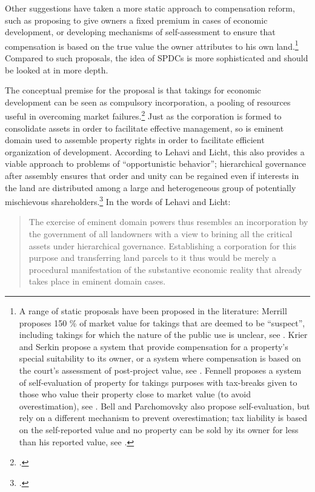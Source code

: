 Other suggestions have taken a more static approach to compensation reform, such as proposing to give owners a fixed premium in cases of economic development, or developing mechanisms of self-assessment to ensure that compensation is based on the true value the owner attributes to his own land.\footnote{A range of static proposals have been proposed in the literature: Merrill proposes 150 \% of market value for takings that are deemed to be ``suspect'', including takings for which the nature of the public use is unclear, see \cite[90-93]{merrill86}. Krier and Serkin propose a system that provide compensation for a property's special suitability to its owner, or a system where compensation is based on the court's assessment of post-project value, see \cite[865-873]{krier04}. Fennell proposes a system of self-evaluation of property for takings purposes with tax-breaks given to those who value their property close to market value (to avoid overestimation), see \cite[995-996]{fennell04}. Bell and Parchomovsky also propose self-evaluation, but rely on a different mechanism to prevent overestimation; tax liability is based on the self-reported value and no property can be sold by its owner for less than his reported value, see \cite[890-900]{bell07}.} Compared to such proposals, the idea of SPDCs is more sophisticated and should be looked at in more depth. 

The conceptual premise for the proposal is that takings for economic development can be seen as compulsory incorporation, a pooling of resources useful in overcoming market failures.\footcite[1732-1733]{lehavi07} Just as the corporation is formed to consolidate assets in order to facilitate effective management, so is eminent domain used to assemble property rights in order to facilitate efficient organization of development. According to Lehavi and Licht, this also provides a viable approach to problems of ``opportunistic behavior''; hierarchical governance after assembly ensures that order and unity can be regained even if interests in the land are distributed among a large and heterogeneous group of potentially mischievous shareholders.\footcite[1733]{lehavi07} In the words of Lehavi and Licht:

\begin{quote}
The exercise of eminent domain powers thus resembles an incorporation by the government of all landowners with a view to brining all the critical assets under hierarchical governance. Establishing a corporation for this purpose and transferring land parcels to it thus would be merely a procedural manifestation of the substantive economic reality that already takes place in eminent domain cases.
\end{quote}

